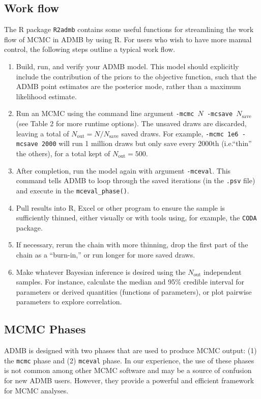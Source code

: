 \documentclass{article}\usepackage[]{graphicx}\usepackage[]{color}
\begin{document}
\subsection{Work flow}
The R package \texttt{R2admb} contains some useful functions
for streamlining the work flow of MCMC in ADMB by using
R. For users who wish to have more manual control, the
following steps outline a typical work flow.
\begin{enumerate}
\item Build, run, and verify your ADMB model. This model should
  explicitly include the contribution of the priors to the
  objective function, such that the ADMB point estimates are the
  posterior mode, rather than a maximum likelihood estimate.
\item Run an MCMC using the command line argument
  \texttt{-mcmc $N$ -mcsave $N_{\text{save}}$} (see Table 2
  for more runtime options). The unsaved draws are
  discarded, leaving a total of
  $N_{\text{out}}=N/N_{\text{save}}$ saved draws. For
  example, \texttt{-mcmc 1e6 -mcsave 2000} will run 1
  million draws but only save every 2000th (i.e.``thin'' the
  others), for a total kept of $N_{\text{out}}=500$.
\item After completion, run the model again with argument
  \texttt{-mceval}. This command tells ADMB to loop through
  the saved iterations (in the \texttt{.psv} file) and
  execute in the \texttt{mceval\_phase()}.
\item Pull results into R, Excel or other program to ensure the
  sample is sufficiently thinned, either visually or with
  tools using, for example, the \texttt{CODA} package.
\item If necessary, rerun the chain with more thinning, drop
  the first part of the chain as a ``burn-in,'' or run
  longer for more saved draws.
\item Make whatever Bayesian inference is desired using the
  $N_{\text{out}}$ independent samples. For instance,
  calculate the median and 95\% credible interval for
  parameters or derived quantities (functions of
  parameters), or plot pairwise parameters to explore
  correlation.
\end{enumerate}

\subsection{MCMC Phases}
ADMB is designed with two phases that are used to produce
MCMC output: (1) the \texttt{mcmc} phase and (2)
\texttt{mceval} phase. In our experience, the use of these
phases is not common among other MCMC software and may be a
source of confusion for new ADMB users. However, they
provide a powerful and efficient framework for MCMC
analyses.
\end{document}

